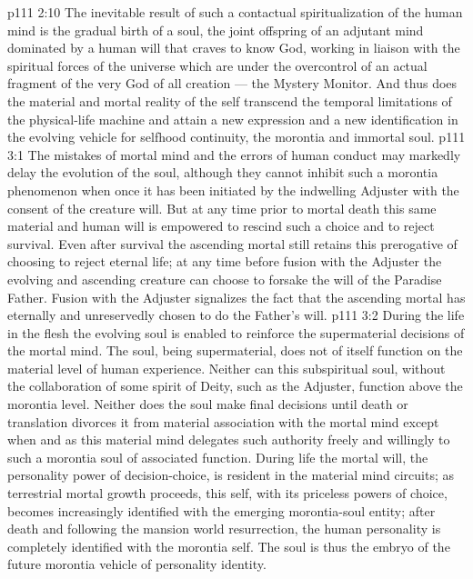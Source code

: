 \vs p111 2:10 The inevitable result of such a contactual spiritualization of the human mind is the gradual birth of a soul, the joint offspring of an adjutant mind dominated by a human will that craves to know God, working in liaison with the spiritual forces of the universe which are under the overcontrol of an actual fragment of the very God of all creation --- the Mystery Monitor. And thus does the material and mortal reality of the self transcend the temporal limitations of the physical\hyp{}life machine and attain a new expression and a new identification in the evolving vehicle for selfhood continuity, the morontia and immortal soul.
\vs p111 3:1 The mistakes of mortal mind and the errors of human conduct may markedly delay the evolution of the soul, although they cannot inhibit such a morontia phenomenon when once it has been initiated by the indwelling Adjuster with the consent of the creature will. But at any time prior to mortal death this same material and human will is empowered to rescind such a choice and to reject survival. Even after survival the ascending mortal still retains this prerogative of choosing to reject eternal life; at any time before fusion with the Adjuster the evolving and ascending creature can choose to forsake the will of the Paradise Father. Fusion with the Adjuster signalizes the fact that the ascending mortal has eternally and unreservedly chosen to do the Father’s will.
\vs p111 3:2 During the life in the flesh the evolving soul is enabled to reinforce the supermaterial decisions of the mortal mind. The soul, being supermaterial, does not of itself function on the material level of human experience. Neither can this subspiritual soul, without the collaboration of some spirit of Deity, such as the Adjuster, function above the morontia level. Neither does the soul make final decisions until death or translation divorces it from material association with the mortal mind except when and as this material mind delegates such authority freely and willingly to such a morontia soul of associated function. During life the mortal will, the personality power of decision\hyp{}choice, is resident in the material mind circuits; as terrestrial mortal growth proceeds, this self, with its priceless powers of choice, becomes increasingly identified with the emerging morontia\hyp{}soul entity; after death and following the mansion world resurrection, the human personality is completely identified with the morontia self. The soul is thus the embryo of the future morontia vehicle of personality identity.
